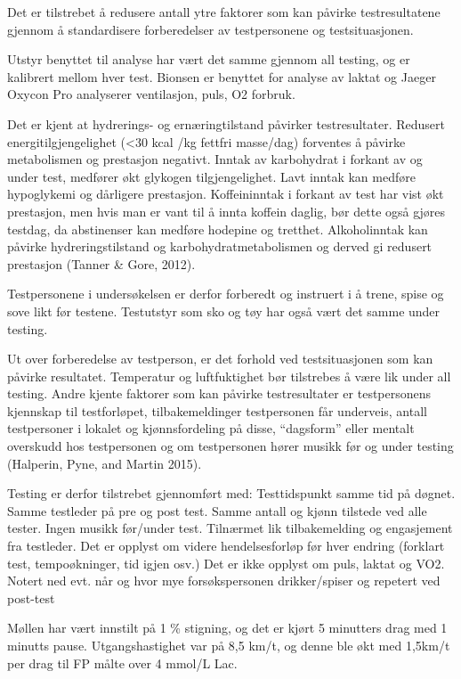 \documentclass[
  letterpaper,
  DIV=11,
  numbers=noendperiod]{scrreprt}
\begin{document}
Det er tilstrebet å redusere antall ytre faktorer som kan påvirke
testresultatene gjennom å standardisere forberedelser av testpersonene
og testsituasjonen.

Utstyr benyttet til analyse har vært det samme gjennom all testing, og
er kalibrert mellom hver test. Bionsen er benyttet for analyse av laktat
og Jaeger Oxycon Pro analyserer ventilasjon, puls, O2 forbruk.

Det er kjent at hydrerings- og ernæringtilstand påvirker testresultater.
Redusert energitilgjengelighet (\textless30 kcal /kg fettfri masse/dag)
forventes å påvirke metabolismen og prestasjon negativt. Inntak av
karbohydrat i forkant av og under test, medfører økt glykogen
tilgjengelighet. Lavt inntak kan medføre hypoglykemi og dårligere
prestasjon. Koffeininntak i forkant av test har vist økt prestasjon, men
hvis man er vant til å innta koffein daglig, bør dette også gjøres
testdag, da abstinenser kan medføre hodepine og tretthet. Alkoholinntak
kan påvirke hydreringstilstand og karbohydratmetabolismen og derved gi
redusert prestasjon (Tanner \& Gore, 2012).

Testpersonene i undersøkelsen er derfor forberedt og instruert i å
trene, spise og sove likt før testene. Testutstyr som sko og tøy har
også vært det samme under testing.

Ut over forberedelse av testperson, er det forhold ved testsituasjonen
som kan påvirke resultatet. Temperatur og luftfuktighet bør tilstrebes å
være lik under all testing. Andre kjente faktorer som kan påvirke
testresultater er testpersonens kjennskap til testforløpet,
tilbakemeldinger testpersonen får underveis, antall testpersoner i
lokalet og kjønnsfordeling på disse, ``dagsform'' eller mentalt
overskudd hos testpersonen og om testpersonen hører musikk før og under
testing (Halperin, Pyne, and Martin 2015).

Testing er derfor tilstrebet gjennomført med: Testtidspunkt samme tid på
døgnet. Samme testleder på pre og post test. Samme antall og kjønn
tilstede ved alle tester. Ingen musikk før/under test. Tilnærmet lik
tilbakemelding og engasjement fra testleder. Det er opplyst om videre
hendelsesforløp før hver endring (forklart test, tempoøkninger, tid
igjen osv.) Det er ikke opplyst om puls, laktat og VO2. Notert ned evt.
når og hvor mye forsøkspersonen drikker/spiser og repetert ved post-test

Møllen har vært innstilt på 1 \% stigning, og det er kjørt 5 minutters
drag med 1 minutts pause. Utgangshastighet var på 8,5 km/t, og denne ble
økt med 1,5km/t per drag til FP målte over 4 mmol/L Lac.
\end{document}
